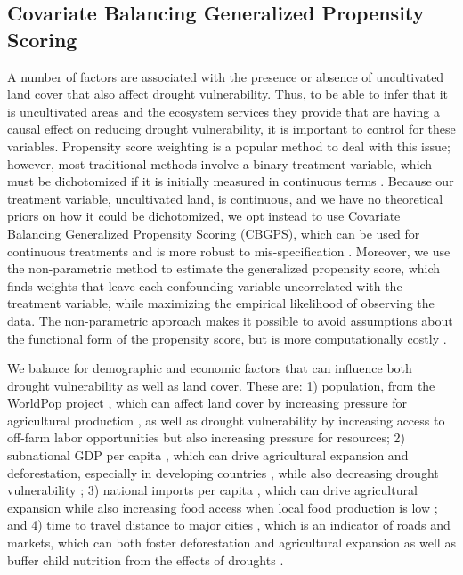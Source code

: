 \documentclass[titlepage]{article}
\begin{document}
\subsection{Covariate Balancing Generalized Propensity Scoring}
A number of factors are associated with the presence or absence of uncultivated land cover that also affect drought vulnerability.  Thus, to be able to infer that it is uncultivated areas and the ecosystem services they provide that are having a causal effect on reducing drought vulnerability, it is important to control for these variables.  Propensity score weighting is a popular method to deal with this issue; however, most traditional methods involve a binary treatment variable, which must be dichotomized if it is initially measured in continuous terms \citep{Hirano2003, Robins2000}.  Because our treatment variable, uncultivated land, is continuous, and we have no theoretical priors on how it could be dichotomized, we opt instead to use Covariate Balancing Generalized Propensity Scoring (CBGPS), which can be used for continuous treatments and is more robust to mis-specification \citep{Fong2018}.  Moreover, we use the non-parametric method to estimate the generalized propensity score, which finds weights that leave each confounding variable uncorrelated with the treatment variable, while maximizing the empirical likelihood of observing the data.  The non-parametric approach makes it possible to avoid assumptions about the functional form of the propensity score, but is more computationally costly \citep{Fong2018}.

We balance for demographic and economic factors that can influence both drought vulnerability as well as land cover.  These are: 1) population, from the WorldPop project \citep{Tatem2017}, which can affect land cover by increasing pressure for agricultural production \citep{ouedraogo2010land}, as well as drought vulnerability by increasing access to off-farm labor opportunities but also increasing pressure for resources; 2) subnational GDP per capita \citep{Kummu2018}, which can drive agricultural expansion and deforestation, especially in developing countries \citep{culas2012redd}, while also decreasing drought vulnerability \citep{Carrao2016}; 3) national imports per capita \citep{WorldBank2017}, which can drive agricultural expansion \citep{Meyfroidt2013} while also increasing food access when local food production is low \citep{janssens2020global}; and 4) time to travel distance to major cities \citep{Weiss2018, Uchida2008}, which is an indicator of roads and markets, which can both foster deforestation and agricultural expansion \citep{barber2014roads} as well as buffer child nutrition from the effects of droughts \citep{Shively2017}.
\end{document}
